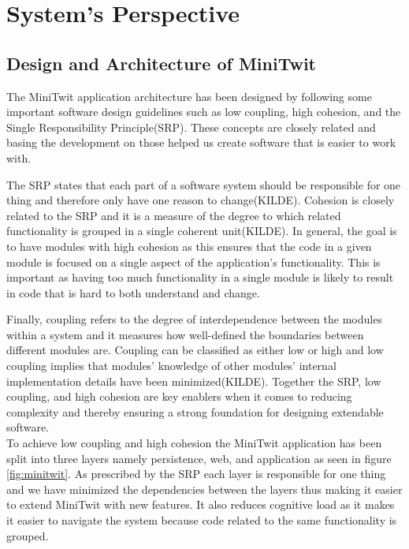 \section{System's Perspective}

\subsection{Design and Architecture of MiniTwit}
The MiniTwit application architecture has been designed by following some important software design guidelines 
such as low coupling, high cohesion, and the Single Responsibility Principle(SRP). 
These concepts are closely related and basing the development on those helped us create software that is easier to work with. 

The SRP states that each part of a software system should be responsible for one thing and therefore only have one reason to change(KILDE). 
Cohesion is closely related to the SRP and it is a measure of the degree to which related functionality is grouped in a single coherent unit(KILDE). 
In general, the goal is to have modules with high cohesion as this ensures that the code in a given module is focused on a single aspect of the application's functionality. 
This is important as having too much functionality in a single module is likely to result in code that is hard to both understand and change. 

Finally, coupling refers to the degree of interdependence between the modules within a system and it measures how well-defined the boundaries between different modules are. 
Coupling can be classified as either low or high and low coupling implies that modules' knowledge of other modules' internal implementation details have been minimized(KILDE).
Together the SRP, low coupling, and high cohesion are key enablers when it comes to reducing complexity and thereby ensuring a strong foundation for designing extendable software. \\

To achieve low coupling and high cohesion the MiniTwit application has been split into three layers namely persistence, web, and application as seen in figure \ref{fig:minitwit}. 
As prescribed by the SRP each layer is responsible for one thing and we have minimized the dependencies between the layers thus making it easier to extend MiniTwit with new features. 
It also reduces cognitive load as it makes it easier to navigate the system because code related to the same functionality is grouped. 


